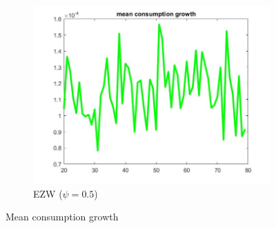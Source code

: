 \documentclass[12pt,a4paper]{article}
\begin{document}
\begin{figure}[h!]
\begin{subfigure}[b]{0.32\linewidth}
    \includegraphics[width=\linewidth]{graphs/Q4/mean_cons_grow_ezw.jpg}
      \caption{EZW ($\psi = 0.5$)}
  \end{subfigure}
  \caption{Mean consumption growth}
    \label{fig:8}
\end{figure}
\end{document}
